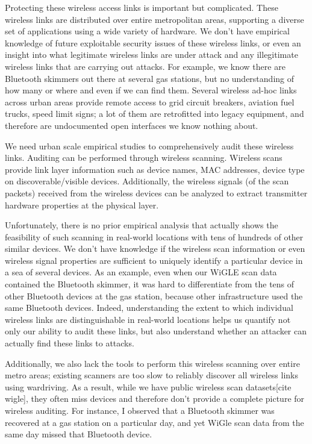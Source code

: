 Protecting these wireless access links is important but complicated.
%
These wireless links are distributed over entire metropolitan areas, supporting a diverse set of applications using a wide variety of hardware.
%
We don't have empirical knowledge of future exploitable security issues of these wireless links, or even an insight into what legitimate wireless links are under attack and any illegitimate wireless links that are carrying out attacks.
%
For example, we know there are Bluetooth skimmers out there at several gas stations, but no understanding of how many or where and even if we can find them.
%
Several wireless ad-hoc links across urban areas provide remote access to grid circuit breakers, aviation fuel trucks, speed limit signs; a lot of them are retrofitted into legacy equipment, and therefore are undocumented open interfaces we know nothing about.

We need urban scale empirical studies to comprehensively audit these wireless links.
%
Auditing can be performed through wireless scanning.
%
Wireless scans provide link layer information such as device names, MAC addresses, device type on discoverable/visible devices.
%
Additionally, the wireless signals (of the scan packets) received from the wireless devices can be analyzed to extract transmitter hardware properties at the physical layer.
%

Unfortunately, there is no prior empirical analysis that actually shows the feasibility of such scanning in real-world locations with tens of hundreds of other similar devices.
%
We don't have knowledge if the wireless scan information or even wireless signal properties are sufficient to uniquely identify a particular device in a sea of several devices.
%
As an example, even when our WiGLE scan data contained the Bluetooth skimmer, it was hard to differentiate from the tens of other Bluetooth devices at the gas station, because other infrastructure used the same Bluetooth devices.
%
Indeed, understanding the extent to which individual wireless links are distinguishable in real-world locations helps us quantify not only our ability to audit these links, but also understand whether an attacker can actually find these links to attacks.

Additionally, we also lack the tools to perform this wireless scanning over entire metro areas; existing scanners are too slow to reliably discover all wireless links using wardriving.
%
As a result, while we have public wireless scan datasets[cite wigle], they often miss devices and therefore don't provide a complete picture for wireless auditing.
%
For instance, I observed that a Bluetooth skimmer was recovered at a gas station on a particular day, and yet WiGle scan data from the same day missed that Bluetooth device. 
%




